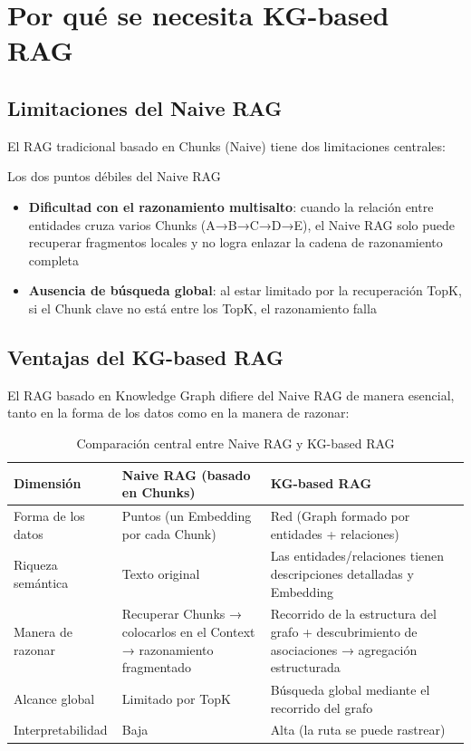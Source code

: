\documentclass[a4paper]{article}
\begin{document}
\section{Por qué se necesita KG-based RAG}

\subsection{Limitaciones del Naive RAG}

El RAG tradicional basado en Chunks (Naive) tiene dos limitaciones centrales:

\begin{importantbox}{Los dos puntos débiles del Naive RAG}
\begin{itemize}
    \item \textbf{Dificultad con el razonamiento multisalto}: cuando la relación entre entidades cruza varios Chunks (A→B→C→D→E), el Naive RAG solo puede recuperar fragmentos locales y no logra enlazar la cadena de razonamiento completa
    \item \textbf{Ausencia de búsqueda global}: al estar limitado por la recuperación TopK, si el Chunk clave no está entre los TopK, el razonamiento falla
\end{itemize}
\end{importantbox}

\subsection{Ventajas del KG-based RAG}

El RAG basado en Knowledge Graph difiere del Naive RAG de manera esencial, tanto en la forma de los datos como en la manera de razonar:

\begin{table}[H]
\centering
\begin{tabular}{p{3cm}p{5cm}p{5cm}}
\toprule
\textbf{Dimensión} & \textbf{Naive RAG (basado en Chunks)} & \textbf{KG-based RAG} \\
\midrule
Forma de los datos & Puntos (un Embedding por cada Chunk) & Red (Graph formado por entidades + relaciones) \\
Riqueza semántica & Texto original & Las entidades/relaciones tienen descripciones detalladas y Embedding \\
Manera de razonar & Recuperar Chunks → colocarlos en el Context → razonamiento fragmentado & Recorrido de la estructura del grafo + descubrimiento de asociaciones → agregación estructurada \\
Alcance global & Limitado por TopK & Búsqueda global mediante el recorrido del grafo \\
Interpretabilidad & Baja & Alta (la ruta se puede rastrear) \\
\bottomrule
\end{tabular}
\caption{Comparación central entre Naive RAG y KG-based RAG}
\end{table}
\end{document}
